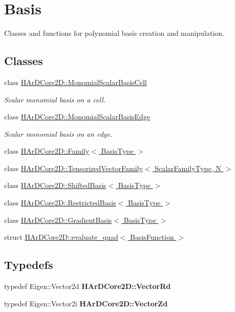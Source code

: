 \hypertarget{group__Basis}{}\section{Basis}
\label{group__Basis}


Classes and functions for polynomial basis creation and manipulation.  


\subsection*{Classes}
\begin{DoxyCompactItemize}
\item 
class \hyperlink{classHArDCore2D_1_1MonomialScalarBasisCell}{H\+Ar\+D\+Core2\+D\+::\+Monomial\+Scalar\+Basis\+Cell}
\begin{DoxyCompactList}\small\item\em Scalar monomial basis on a cell. \end{DoxyCompactList}\item 
class \hyperlink{classHArDCore2D_1_1MonomialScalarBasisEdge}{H\+Ar\+D\+Core2\+D\+::\+Monomial\+Scalar\+Basis\+Edge}
\begin{DoxyCompactList}\small\item\em Scalar monomial basis on an edge. \end{DoxyCompactList}\item 
class \hyperlink{classHArDCore2D_1_1Family}{H\+Ar\+D\+Core2\+D\+::\+Family$<$ Basis\+Type $>$}
\item 
class \hyperlink{classHArDCore2D_1_1TensorizedVectorFamily}{H\+Ar\+D\+Core2\+D\+::\+Tensorized\+Vector\+Family$<$ Scalar\+Family\+Type, N $>$}
\item 
class \hyperlink{classHArDCore2D_1_1ShiftedBasis}{H\+Ar\+D\+Core2\+D\+::\+Shifted\+Basis$<$ Basis\+Type $>$}
\item 
class \hyperlink{classHArDCore2D_1_1RestrictedBasis}{H\+Ar\+D\+Core2\+D\+::\+Restricted\+Basis$<$ Basis\+Type $>$}
\item 
class \hyperlink{classHArDCore2D_1_1GradientBasis}{H\+Ar\+D\+Core2\+D\+::\+Gradient\+Basis$<$ Basis\+Type $>$}
\item 
struct \hyperlink{structHArDCore2D_1_1evaluate__quad}{H\+Ar\+D\+Core2\+D\+::evaluate\+\_\+quad$<$ Basis\+Function $>$}
\end{DoxyCompactItemize}
\subsection*{Typedefs}
\begin{DoxyCompactItemize}
\item 
\mbox{\label{group__Basis_ga2b59ab7a013fef73321867484e13e2f3}} 
typedef Eigen\+::\+Vector2d {\bfseries H\+Ar\+D\+Core2\+D\+::\+Vector\+Rd}
\item 
\mbox{\label{group__Basis_ga2bc880baa1a6163014c7f37345bf8ac6}} 
typedef Eigen\+::\+Vector2i {\bfseries H\+Ar\+D\+Core2\+D\+::\+Vector\+Zd}
\end{DoxyCompactItemize}
